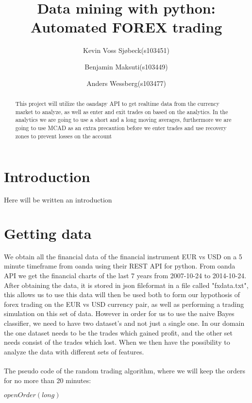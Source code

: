 \documentclass[10pt]{IEEEtran}
\title{Data mining with python: \\Automated FOREX trading}
\author{
	Kevin Voss Sjøbeck(s103451)\\
	\and
	Benjamin Maksuti(s103449)\\
	\and
	Anders Wessberg(s103477)
}
\begin{document}
\maketitle

\begin{abstract}
This project will utilize the oandapy API to get realtime data from the currency market to analyze, as well as enter and exit trades on based on the analytics. In the analytics we are going to use a short and a long moving averages, furthermore we are going to use MCAD as an extra precaution before we enter trades and use recovery zones to prevent losses on the account
\end{abstract}

\section{Introduction}
Here will be written an introduction


\section{Getting data}
We obtain all the financial data of the financial instrument EUR vs USD on a 5 minute timeframe from oanda using their REST API for python. From oanda API we get the financial charts of the last 7 years from 2007-10-24 to 2014-10-24. After obtaining the data, it is stored in json fileformat in a file called "fxdata.txt", this allows us to use this data will then be used both to form our hypothosis of forex trading on the EUR vs USD currency pair, as well as performing a trading simulation on this set of data. However in order for us to use the naive Bayes classifier, we need to have two dataset's and not just a single one. In our domain the one dataset needs to be the trades which gained profit, and the other set needs consist of the trades which lost. When we then have the possibility to analyze the data with different sets of features.\\
\\
The pseudo code of the random trading algorithm, where we will keep the orders for no more than 20 minutes:
\begin{center}
\begin{algorithmic}
    	\State $openOrder(long)$	    
	\EndIf
		\EndIf
	\EndFor
\EndWhile
{}

\end{algorithmic}
\end{center}
\end{document}
